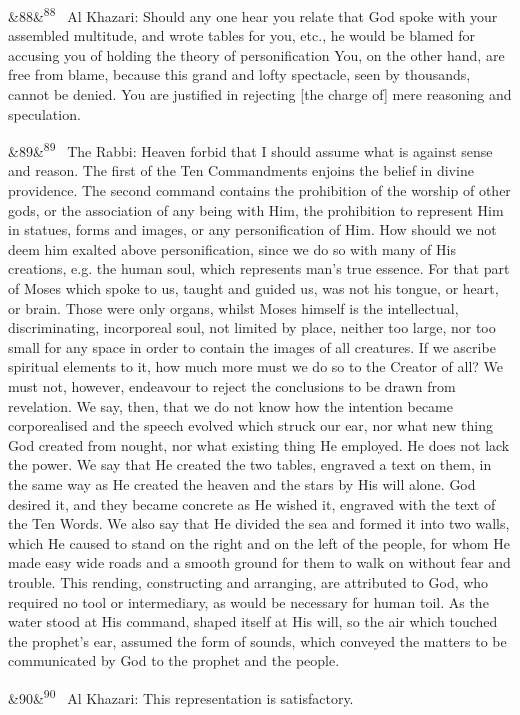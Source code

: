 \documentclass[12pt]{article}
\newcommand{\para}[1][]{\par\noindent\ifx&#1&\else\textsuperscript{\footnotesize #1}~\fi}
\begin{document}
\para[88] Al Khazari: Should any one hear you relate that God spoke with your assembled multitude, and wrote tables for you, etc., he would be blamed for accusing you of holding the theory of personification You, on the other hand, are free from blame, because this grand and lofty spectacle, seen by thousands, cannot be denied. You are justified in rejecting [the charge of] mere reasoning and speculation.

\para[89] The Rabbi: Heaven forbid that I should assume what is against sense and reason. The first of the Ten Commandments enjoins the belief in divine providence. The second command contains the prohibition of the worship of other gods, or the association of any being with Him, the prohibition to represent Him in statues, forms and images, or any personification of Him. How should we not deem him exalted above personification, since we do so with many of His creations, e.g. the human soul, which represents man's true essence. For that part of Moses which spoke to us, taught and guided us, was not his tongue, or heart, or brain. Those were only organs, whilst Moses himself is the intellectual, discriminating, incorporeal soul, not limited by place, neither too large, nor too small for any space in order to contain the images of all creatures. If we ascribe spiritual elements to it, how much more must we do so to the Creator of all? We must not, however, endeavour to reject the conclusions to be drawn from revelation. We say, then, that we do not know how the intention became corporealised and the speech evolved which struck our ear, nor what new thing God created from nought, nor what existing thing He employed. He does not lack the power. We say that He created the two tables, engraved a text on them, in the same way as He created the heaven and the stars by His will alone. God desired it, and they became concrete as He wished it, engraved with the text of the Ten Words. We also say that He divided the sea and formed it into two walls, which He caused to stand on the right and on the left of the people, for whom He made easy wide roads and a smooth ground for them to walk on without fear and trouble. This rending, constructing and arranging, are attributed to God, who required no tool or intermediary, as would be necessary for human toil. As the water stood at His command, shaped itself at His will, so the air which touched the prophet's ear, assumed the form of sounds, which conveyed the matters to be communicated by God to the prophet and the people.

\para[90] Al Khazari: This representation is satisfactory.
\end{document}
